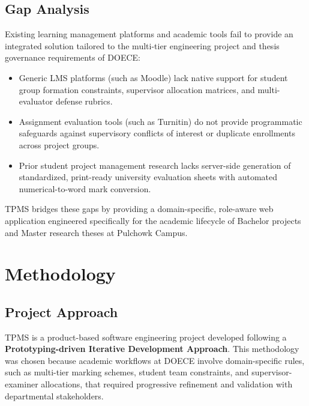 \documentclass[12pt,a4paper]{report}
\begin{document}
\section{Gap Analysis}
Existing learning management platforms and academic tools fail to provide an integrated solution tailored to the multi-tier engineering project and thesis governance requirements of DOECE:

\begin{itemize}
  \item Generic LMS platforms (such as Moodle) lack native support for student group formation constraints, supervisor allocation matrices, and multi-evaluator defense rubrics.
  \item Assignment evaluation tools (such as Turnitin) do not provide programmatic safeguards against supervisory conflicts of interest or duplicate enrollments across project groups.
  \item Prior student project management research lacks server-side generation of standardized, print-ready university evaluation sheets with automated numerical-to-word mark conversion.
\end{itemize}

TPMS bridges these gaps by providing a domain-specific, role-aware web application engineered specifically for the academic lifecycle of Bachelor projects and Master research theses at Pulchowk Campus.

\chapter{Methodology}

\section{Project Approach}
TPMS is a product-based software engineering project developed following a \textbf{Prototyping-driven Iterative Development Approach}. This methodology was chosen because academic workflows at DOECE involve domain-specific rules, such as multi-tier marking schemes, student team constraints, and supervisor-examiner allocations, that required progressive refinement and validation with departmental stakeholders.
\end{document}
